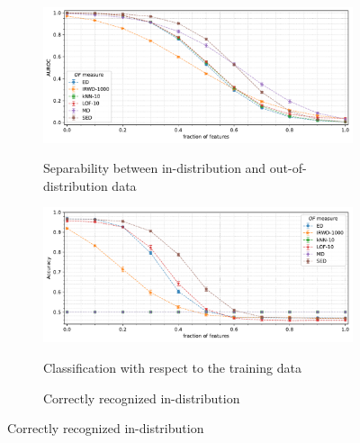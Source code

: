 \begin{figure}[t]
    \centering
    \begin{subfigure}[b]{0.9\textwidth}
        \centering
        \caption{\small Separability between in-distribution and out-of-distribution data}
        \includegraphics[width=\textwidth]{images/variances/f_var/trend-variances-auroc(n_varied)-variance_1.50-distance_16-outliers_varied_False-model_ED,IRWD-1000,kNN-10,LOF-10,MD,SED-aggregated.pdf}
        \label{fig:n_varied-auroc}
    \end{subfigure}
    \begin{subfigure}[b]{0.9\textwidth}
        \centering
        \caption{\small Classification with respect to the training data}
        \includegraphics[width=\textwidth]{images/variances/f_var/trend-variances-accuracy_95(n_varied)-variance_1.50-distance_16-outliers_varied_False-model_ED,IRWD-1000,kNN-10,LOF-10,MD,SED-aggregated.pdf}
        \label{fig:n_varied-accuracy}
    \end{subfigure}
    \begin{subfigure}[b]{0.495\textwidth}
        \centering
        \caption{\small Correctly recognized in-distribution}

\end{subfigure}
\end{figure}
